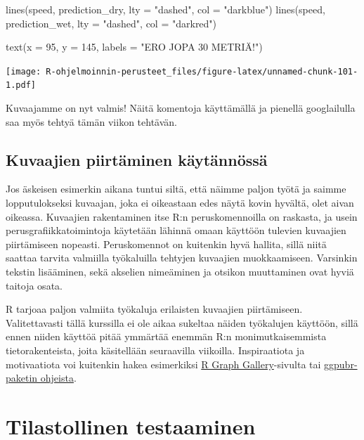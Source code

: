 \documentclass[
]{book}
\newenvironment{Shaded}{\begin{snugshade}}{\end{snugshade}}
\newcommand{\AttributeTok}[1]{\textcolor[rgb]{0.77,0.63,0.00}{#1}}
\newcommand{\DecValTok}[1]{\textcolor[rgb]{0.00,0.00,0.81}{#1}}
\newcommand{\FunctionTok}[1]{\textcolor[rgb]{0.00,0.00,0.00}{#1}}
\newcommand{\NormalTok}[1]{#1}
\newcommand{\StringTok}[1]{\textcolor[rgb]{0.31,0.60,0.02}{#1}}
\begin{document}
\begin{Shaded}
\begin{Highlighting}[]
\FunctionTok{lines}\NormalTok{(speed, prediction\_dry, }\AttributeTok{lty =} \StringTok{"dashed"}\NormalTok{, }\AttributeTok{col =} \StringTok{"darkblue"}\NormalTok{)}
\FunctionTok{lines}\NormalTok{(speed, prediction\_wet, }\AttributeTok{lty =} \StringTok{"dashed"}\NormalTok{, }\AttributeTok{col =} \StringTok{"darkred"}\NormalTok{)}

\FunctionTok{text}\NormalTok{(}\AttributeTok{x =} \DecValTok{95}\NormalTok{, }\AttributeTok{y =} \DecValTok{145}\NormalTok{, }\AttributeTok{labels =} \StringTok{"ERO JOPA 30 METRIÄ!"}\NormalTok{) }
\end{Highlighting}
\end{Shaded}

\texttt{[image: R-ohjelmoinnin-perusteet\_files/figure-latex/unnamed-chunk-101-1.pdf]}

Kuvaajamme on nyt valmis! Näitä komentoja käyttämällä ja pienellä googlailulla saa myös tehtyä tämän viikon tehtävän.

\hypertarget{kuvaajien-piirtuxe4minen-kuxe4ytuxe4nnuxf6ssuxe4}{%
\section{Kuvaajien piirtäminen käytännössä}\label{kuvaajien-piirtuxe4minen-kuxe4ytuxe4nnuxf6ssuxe4}}

Jos äskeisen esimerkin aikana tuntui siltä, että näimme paljon työtä ja saimme lopputulokseksi kuvaajan, joka ei oikeastaan edes näytä kovin hyvältä, olet aivan oikeassa. Kuvaajien rakentaminen itse R:n peruskomennoilla on raskasta, ja usein perusgrafiikkatoimintoja käytetään lähinnä omaan käyttöön tulevien kuvaajien piirtämiseen nopeasti. Peruskomennot on kuitenkin hyvä hallita, sillä niitä saattaa tarvita valmiilla työkaluilla tehtyjen kuvaajien muokkaamiseen. Varsinkin tekstin lisääminen, sekä akselien nimeäminen ja otsikon muuttaminen ovat hyviä taitoja osata.

R tarjoaa paljon valmiita työkaluja erilaisten kuvaajien piirtämiseen. Valitettavasti tällä kurssilla ei ole aikaa sukeltaa näiden työkalujen käyttöön, sillä ennen niiden käyttöä pitää ymmärtää enemmän R:n monimutkaisemmista tietorakenteista, joita käsitellään seuraavilla viikoilla. Inspiraatiota ja motivaatiota voi kuitenkin hakea esimerkiksi \href{https://www.r-graph-gallery.com/index.html}{R Graph Gallery}-sivulta tai \href{https://rpkgs.datanovia.com/ggpubr/index.html}{ggpubr-paketin ohjeista}.

\hypertarget{tests}{%
\chapter{Tilastollinen testaaminen}\label{tests}}
\end{document}
